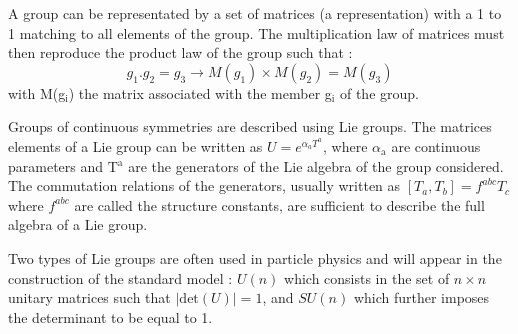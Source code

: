 A group can be representated by a set of matrices (a representation) with a 1 to 1 matching to all elements of the group.
The multiplication law of matrices must then reproduce the product law of the group such that :
\begin{equation}
g_1 . g_2 = g_3 \rightarrow M(g_1)\times M(g_2)=M(g_3)
\end{equation}
with M(g\(_{\text{i}}\)) the matrix associated with the member g\(_{\text{i}}\) of the group.

Groups of continuous symmetries are described using Lie groups.
The matrices elements of  a Lie group can be written as \(U=e^{\alpha_a T^a}\), where \(\alpha_{\text{a}}\) are continuous parameters and T\(^{\text{a}}\) are the generators of the Lie algebra of the group considered.
The commutation relations of the generators, usually written as \([T_a,T_b]=f^{abc}T_c\) where \(f^{abc}\) are called the structure constants, are sufficient to describe the full algebra of a Lie group.

Two types of Lie groups are often used in particle physics and will appear in the construction of the standard model : \(U(n)\) which consists in the set of \(n\times n\) unitary matrices such that \(|\text{det}(U)|=1\), and \(SU(n)\) which further imposes the determinant to be equal to 1.

